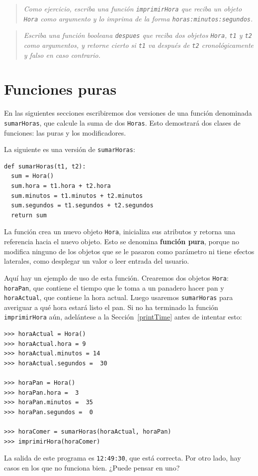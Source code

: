 \begin{quote}
{\em Como ejercicio, escriba una función  \texttt{imprimirHora} que reciba
un objeto \texttt{Hora} como argumento y lo imprima de la forma
 \texttt{horas:minutos:segundos}.}
\end{quote}

\begin{quote}
{\em Escriba una  función booleana \texttt{despues} que reciba dos
objetos \texttt{Hora}, \texttt{t1} y \texttt{t2} como argumentos, y 
retorne cierto si  \texttt{t1} va después de \texttt{t2} cronológicamente
y falso en caso contrario.}
\end{quote}


\section{Funciones puras}

En las siguientes secciones escribiremos dos versiones de una
función denominada \texttt{sumarHoras}, que calcule la suma
de dos   \texttt{Horas}. Esto demostrará dos clases de funciones:
las puras y los modificadores.

La siguiente es una versión de  \texttt{sumarHoras}:

\beforeverb
\begin{verbatim}
def sumarHoras(t1, t2):
  sum = Hora()
  sum.hora = t1.hora + t2.hora
  sum.minutos = t1.minutos + t2.minutos
  sum.segundos = t1.segundos + t2.segundos
  return sum
\end{verbatim}
\afterverb
%
La función crea un nuevo objeto  \texttt{Hora}, inicializa
sus atributos y retorna una referencia hacia el nuevo objeto.
Esto se denomina {\bf función pura}, porque no modifica ninguno
de los objetos que se le pasaron como parámetro ni tiene
efectos laterales, como desplegar un valor o leer entrada
del usuario.

Aquí hay un ejemplo de uso de esta función. Crearemos dos
objetos  {\tt Hora}: \texttt{horaPan}, que contiene el tiempo que le toma a un panadero
hacer pan y \texttt{horaActual}, que contiene la hora actual. Luego usaremos \texttt{sumarHoras} para averiguar
a qué hora estará listo el pan. Si no ha terminado la función {\tt
imprimirHora} aún, adelántese a la Sección~\ref{printTime} antes
de intentar esto:

\beforeverb
\begin{verbatim}
>>> horaActual = Hora()
>>> horaActual.hora = 9
>>> horaActual.minutos = 14
>>> horaActual.segundos =  30

>>> horaPan = Hora()
>>> horaPan.hora =  3
>>> horaPan.minutos =  35
>>> horaPan.segundos =  0

>>> horaComer = sumarHoras(horaActual, horaPan)
>>> imprimirHora(horaComer)
\end{verbatim}
\afterverb
%
La salida de este programa es \texttt{12:49:30}, que está correcta. Por
otro lado, hay casos en los que no funciona bien. ¿Puede pensar en uno?

